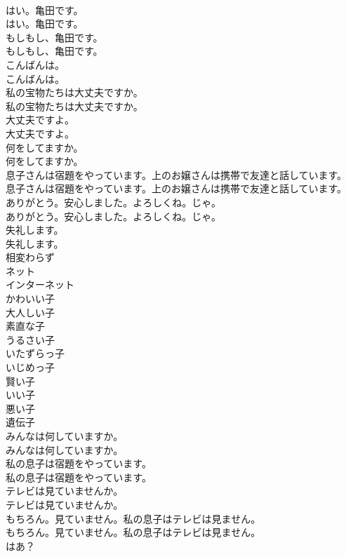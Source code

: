 \documentclass[8pt]{extreport}
\begin{document}
\begin{CJK}{UTF8}{min}
\\	はい。亀田です。	
\\	はい。亀田です。 
\\	もしもし、亀田です。	
\\	もしもし、亀田です。 
\\	こんばんは。	
\\	こんばんは。 
\\	私の宝物たちは大丈夫ですか。	
\\	私の宝物たちは大丈夫ですか。 
\\	大丈夫ですよ。	
\\	大丈夫ですよ。 
\\	何をしてますか。	
\\	何をしてますか。 
\\	息子さんは宿題をやっています。上のお嬢さんは携帯で友達と話しています。	
\\	息子さんは宿題をやっています。上のお嬢さんは携帯で友達と話しています。 
\\	ありがとう。安心しました。よろしくね。じゃ。	
\\	ありがとう。安心しました。よろしくね。じゃ。 
\\	失礼します。	
\\	失礼します。 
\\	相変わらず
\\	ネット
\\	インターネット
\\	かわいい子
\\	大人しい子
\\	素直な子
\\	うるさい子
\\	いたずらっ子
\\	いじめっ子
\\	賢い子
\\	いい子
\\	悪い子
\\	遺伝子
\\	みんなは何していますか。	
\\	みんなは何していますか。 
\\	私の息子は宿題をやっています。	
\\	私の息子は宿題をやっています。 
\\	テレビは見ていませんか。	
\\	テレビは見ていませんか。 
\\	もちろん。見ていません。私の息子はテレビは見ません。	
\\	もちろん。見ていません。私の息子はテレビは見ません。 
\\	はあ？	

\end{CJK}
\end{document}
